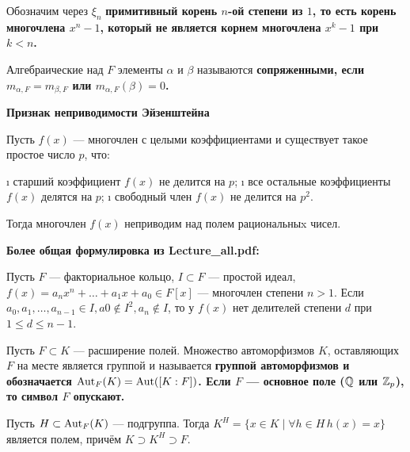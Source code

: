 \begin{defn}
Обозначим через \(\xi_n\) \bf{примитивный корень} \(n\)-ой степени из \(1\), то есть корень многочлена \(x^n-1\), который не является корнем многочлена \(x^k-1\) при \(k<n\).
\end{defn}

\begin{defn}
Алгебраические над \(F\) элементы \(\alpha\) и \(\beta\) называются \bf{сопряженными}, если \(m_{\alpha,F} = m_{\beta,F}\) или \(m_{\alpha,F}(\beta)=0\).
\end{defn}

\begin{defn}
\bf{Признак неприводимости Эйзенштейна}

Пусть \(f(x)\) --- многочлен с целыми коэффициентами и существует такое простое число \(p\), что:

\begin{enumerate}
\def\labelenumi{\arabic{enumi}.}
\tightlist
\i
  старший коэффициент \(f(x)\) не делится на \(p\);
\i
  все остальные коэффициенты \(f(x)\) делятся на \(p\);
\i
  свободный член \(f(x)\) не делится на \(p^2\).
\end{enumerate}

Тогда многочлен \(f(x)\) неприводим над полем рациональныx чисел.

\bf{Более общая формулировка из Lecture\_all.pdf:}

Пусть \(F\) --- факториальное кольцо, \(I \subset F\) --- простой идеал, \(f(x) = a_nx^n+\dots+a_1x + a_0 \in F [x]\) --- многочлен степени \(n > 1\).
Если \(a_0, a_1, \dots, a_{n-1} \in I, a0 \not\in I^2, a_n \not\in I\), то у \(f(x)\) нет делителей степени \(d\) при \(1 \le d\le n-1\).

\end{defn}

\begin{defn}
Пусть \(F \subset K\) --- расширение полей. Множество автоморфизмов \(K\), оставляющих \(F\) на месте является группой и называется \bf{группой автоморфизмов} и обозначается \(\operatorname{Aut}_F(K) = \operatorname{Aut}([K:F])\). Если \(F\) --- основное поле (\(\mathbb{Q}\) или \(\mathbb{Z}_p\)), то символ \(F\) опускают.
\end{defn}

\begin{defn}
Пусть \(H \subset \operatorname{Aut}_F(K)\) --- подгруппа. Тогда \(K^{H} = \{x \in K \mid \forall h \in H \, h(x)=x\}\) является полем, причём \(K \supset K^H \supset F\).
\end{defn}

